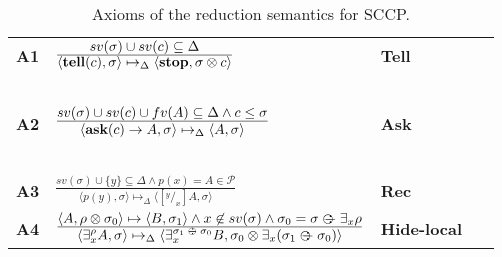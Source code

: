 \documentclass{llncs}
\newcommand{\tell}{{\bf tell}}
\newcommand{\ask}{{\bf ask}}
\newcommand{\ostop}{{\bf stop}}
\def\odiv{\, {\ominus\hspace{-7.7pt} \div} \,}
\begin{document}
\def\odiv{\; {\ominus\hspace{-6pt} \div} \;}
\def\odivvv{\; {\ominus\hspace{-6pt} \div} \;}

\begin{table}  %
   \begin{center}
   \begin{tabular}{llll} 
   \mbox{\bf A1}& $\frac{\displaystyle sv(\sigma) \cup sv(c) \subseteq \Delta } {\displaystyle \langle \hbox{\tell}(c), \sigma \rangle \mapsto_\Delta  \langle \hbox{\ostop},
                                               \sigma \otimes c\rangle}$
   \ \ \ & \bf{Tell}&
  \\ 
  &\mbox{   }&\mbox{   } &\mbox{   }
  \\
  \mbox{\bf A2}& $\frac {\displaystyle sv(\sigma) \cup sv(c) \cup fv(A) \subseteq \Delta \wedge c \leq \sigma}{\displaystyle
  	\begin{array}{l} \langle \hbox{\ask}(c) \rightarrow A, \sigma \rangle \mapsto_\Delta \langle A, \sigma \rangle   	\end{array}}$
    \ \ \ & \bf{Ask}&
    \\
    &\mbox{   }&\mbox{   }&
    \\
  \mbox{\bf A3}& $\frac {\displaystyle sv(\sigma) \cup \{y\} \subseteq \Delta \wedge \displaystyle p(x) = A \in \mathcal{P} }
  {\displaystyle\langle p(y),\sigma\rangle \mapsto_\Delta \langle [^y/_x]A, \sigma \rangle}$ 
  &\bf{Rec}&
  \\
    \mbox{\bf A4}& $\frac {\displaystyle \langle A, \rho \otimes \sigma_0 \rangle
    \mapsto \langle B, \sigma_1 \rangle \wedge x \not \in sv(\sigma) \wedge \sigma_0 
    = \sigma \odiv \exists_x \rho }
    {\displaystyle\langle \exists^{\rho}_x A,\sigma\rangle \mapsto_\Delta \langle 
    \exists^{\sigma_1 \odiv \sigma_0}_x B, \sigma_0 \otimes \exists_x(\sigma_1 \odiv \sigma_0) 
    \rangle}$
    &\bf{Hide-local}&
  \end{tabular}
  \end{center}
\caption{Axioms of the reduction semantics for SCCP.}
\label{fig:operational}
\end{table}
\end{document}
